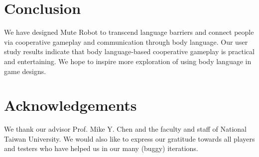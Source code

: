 \documentclass{chi-ext}
\begin{document}

\section{Conclusion}
We have designed Mute Robot to transcend language barriers and connect people via cooperative gameplay and communication through body language.
Our user study results indicate that body language-based cooperative gameplay is practical and entertaining.
We hope to inspire more exploration of using body language in game designs.




\section{Acknowledgements}
We thank our advisor Prof. Mike Y. Chen and the faculty and staff of National Taiwan University.
We would also like to express our gratitude towards all players and testers who have helped us in our many (buggy) iterations. 



\balance


\end{document}
